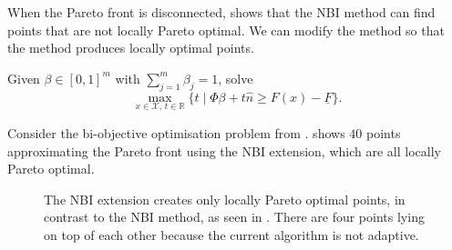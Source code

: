 \documentclass[main.tex]{subfiles}
\begin{document}
When the Pareto front is disconnected, 
shows that the NBI method can find
points that are not locally Pareto optimal.
We can modify the method so that the method produces
locally optimal points.
\begin{mydef}
  Given $\beta\in{[0,1]}^m$ with $\sum_{j=1}^m\beta_j=1$,
  solve
  \begin{equation}
    \max_{x\in\mathcal{X},\,t\in\mathbb{R}} \{t \mid \Phi\beta +
    t\hat{n} \geq F(x) - \underline{F}\}.
  \end{equation}
\end{mydef}

\begin{example}\label{ex:pareto_disconnected_nbi_ineq}
  Consider the bi-objective optimisation problem from
  .
  shows $\num{40}$ points approximating the Pareto front using the NBI
  extension, which are all locally Pareto optimal.
  \begin{figure}[htb]
    \centering
    \caption[The NBI extension]{The NBI extension creates only locally Pareto optimal
      points, in contrast to the NBI method, as seen in
      .
      There are four points lying on top of each other
      because the current algorithm is not adaptive.}\label{fig:pareto_disconnected_nbi_ineq}
  \end{figure}
\end{example}
\end{document}
